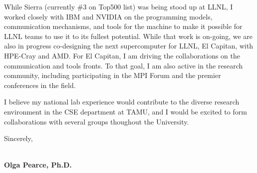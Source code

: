 \documentclass[10pt,letterpaper]{moderncv/moderncv}
\begin{document}
While Sierra (currently \#3 on Top500 list) was being stood up at LLNL, I worked closely with IBM and NVIDIA on the programming models,
communication mechanisms, and tools for the machine to make it possible for LLNL teams to use it to its fullest potential.
While that work is on-going, we are also in progress co-designing the next supercomputer for LLNL, El Capitan, with HPE-Cray and AMD.
For El Capitan, I am driving the collaborations on the communication and tools fronts.  To that goal,
I am also active in the research community, including participating in the MPI Forum and the premier conferences in the field.

I believe my national lab experience would contribute to the diverse research environment in the CSE department at TAMU, and I would be excited to form collaborations with several groups thoughout the University.




Sincerely,

\ \\

\textbf{Olga Pearce, Ph.D.}
\end{document}
